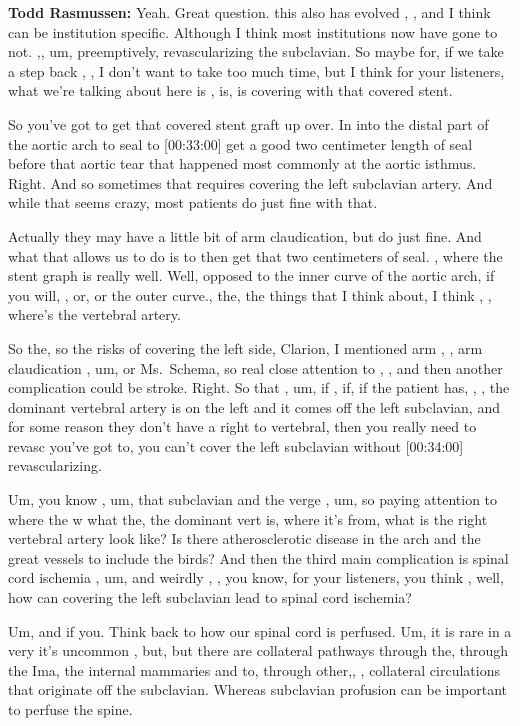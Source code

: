 \documentclass[
]{book}
\begin{document}
\textbf{Todd Rasmussen:} Yeah. Great question. this also has evolved , , and
I think can be institution specific. Although I think most institutions
now have gone to not. ,, um, preemptively, revascularizing the
subclavian. So maybe for, if we take a step back , , I don't want to
take too much time, but I think for your listeners, what we're talking
about here is , is, is covering with that covered stent.

So you've got to get that covered stent graft up over. In into the
distal part of the aortic arch to seal to {[}00:33:00{]} get a good two
centimeter length of seal before that aortic tear that happened most
commonly at the aortic isthmus. Right. And so sometimes that requires
covering the left subclavian artery. And while that seems crazy, most
patients do just fine with that.

Actually they may have a little bit of arm claudication, but do just
fine. And what that allows us to do is to then get that two centimeters
of seal. , where the stent graph is really well. Well, opposed to the
inner curve of the aortic arch, if you will, , or, or the outer curve.,
the, the things that I think about, I think , , where's the vertebral
artery.

So the, so the risks of covering the left side, Clarion, I mentioned arm
, , arm claudication , um, or Ms.~Schema, so real close attention to , ,
and then another complication could be stroke. Right. So that , um, if ,
if, if the patient has, , , the dominant vertebral artery is on the left
and it comes off the left subclavian, and for some reason they don't
have a right to vertebral, then you really need to revasc you've got to,
you can't cover the left subclavian without {[}00:34:00{]} revascularizing.

Um, you know , um, that subclavian and the verge , um, so paying
attention to where the w what the, the dominant vert is, where it's
from, what is the right vertebral artery look like? Is there
atherosclerotic disease in the arch and the great vessels to include the
birds? And then the third main complication is spinal cord ischemia ,
um, and weirdly , , you know, for your listeners, you think , well, how
can covering the left subclavian lead to spinal cord ischemia?

Um, and if you. Think back to how our spinal cord is perfused. Um, it is
rare in a very it's uncommon , but, but there are collateral pathways
through the, through the Ima, the internal mammaries and to, through
other,, , collateral circulations that originate off the subclavian.
Whereas subclavian profusion can be important to perfuse the spine.
\end{document}
